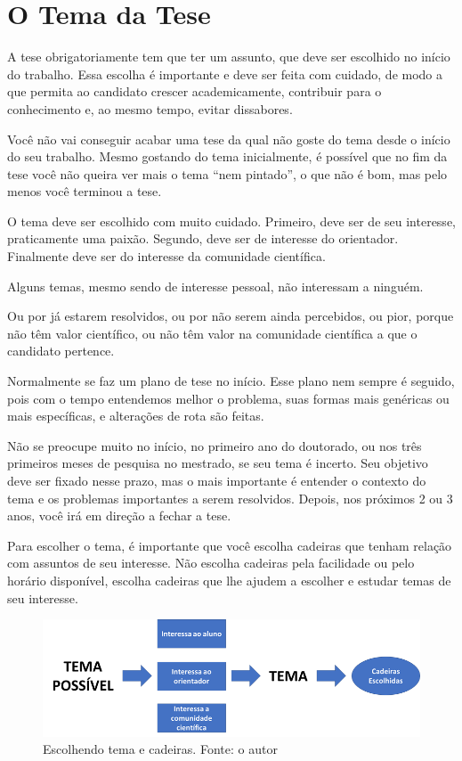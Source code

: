 \chapter{O Tema da Tese}

A tese obrigatoriamente tem que ter um assunto, que deve ser escolhido no início do trabalho. Essa escolha é importante e deve ser feita com cuidado, de modo a que permita ao candidato crescer academicamente, contribuir para o conhecimento e, ao mesmo tempo, evitar dissabores.


Você não vai conseguir acabar uma tese da qual não goste do tema desde o início do seu trabalho. Mesmo gostando do tema inicialmente, é possível que no fim da tese você não queira ver mais o tema “nem pintado”, o que não é bom, mas pelo menos você terminou a tese.

O tema deve ser escolhido com muito cuidado. Primeiro, deve ser de seu interesse, praticamente uma paixão. Segundo, deve ser de interesse do orientador. Finalmente deve ser do interesse da comunidade científica.

Alguns temas, mesmo sendo de interesse pessoal, não interessam a ninguém.

Ou por já estarem resolvidos, ou por não serem ainda percebidos, ou pior, porque não têm valor científico, ou não têm valor na comunidade científica a que o candidato pertence.

Normalmente se faz um plano de tese no início. Esse plano nem sempre é seguido, pois com o tempo entendemos melhor o problema, suas formas mais genéricas ou mais específicas, e alterações de rota são feitas.

Não se preocupe muito no início, no primeiro ano do doutorado, ou nos três primeiros meses de pesquisa no mestrado, se seu tema é incerto. Seu objetivo deve ser fixado nesse prazo, mas o mais importante é entender o contexto do tema e os problemas importantes a serem resolvidos. Depois, nos próximos 2 ou 3 anos, você irá em direção a fechar a tese.

Para escolher o tema, é importante que você escolha cadeiras que tenham relação com assuntos de seu interesse. Não escolha cadeiras pela facilidade ou pelo horário disponível, escolha cadeiras que lhe ajudem a escolher e estudar temas de seu interesse.

\begin{figure}[hbt]
    \centering
    \includegraphics[width=0.9\linewidth]{Images/escolhatemacadeiras}
    \caption{Escolhendo tema e cadeiras. Fonte: o autor}
    \label{fig:escolhatemacadeiras}
\end{figure}


